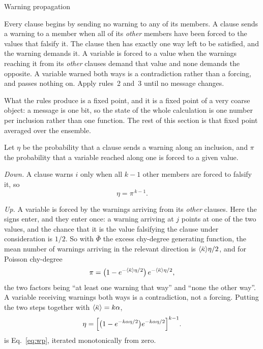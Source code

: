 \begin{model}{Warning propagation}
\begin{rules}
 Every clause begins by sending no warning to any of its
members.
 A clause sends a warning to a member when all of its
\emph{other} members have been forced to the values that falsify it. The clause
then has exactly one way left to be satisfied, and the warning demands it.
 A variable is forced to a value when the warnings
reaching it from its \emph{other} clauses demand that value and none demands the
opposite. A variable warned both ways is a contradiction rather than a forcing,
and passes nothing on.
 Apply rules~2 and~3 until no message changes.
\end{rules}
\end{model}

What the rules produce is a fixed point, and it is a fixed point of a very
coarse object: a message is one bit, so the state of the whole calculation is
one number per inclusion rather than one function. The rest of this section is
that fixed point averaged over the ensemble.

Let $\eta$ be the probability that a clause sends a warning along an inclusion,
and $\pi$ the probability that a variable reached along one is forced to a given
value.

\emph{Down.} A clause warns $i$ only when all $k-1$ other members are forced to
falsify it, so
\[
  \eta=\pi^{\,k-1}.
\]

\emph{Up.} A variable is forced by the warnings arriving from its \emph{other}
clauses. Here the signs enter, and they enter once: a warning arriving at $j$
points at one of the two values, and the chance that it is the value falsifying
the clause under consideration is $1/2$. So with $\bar\Phi$ the excess
chy-degree generating function, the mean number of warnings arriving in the
relevant direction is $\langle \bar\kappa \rangle\eta/2$, and for Poisson chy-degree
\[
  \pi=\bigl(1-e^{-\langle \bar\kappa \rangle\eta/2}\bigr)\,e^{-\langle \bar\kappa \rangle\eta/2},
\]
the two factors being ``at least one warning that way'' and ``none the other
way''. A variable receiving warnings both ways is a contradiction, not a
forcing. Putting the two steps together with $\langle \bar\kappa \rangle=k\alpha$,
\begin{equation}
  \eta=\Bigl[\bigl(1-e^{-k\alpha\eta/2}\bigr)e^{-k\alpha\eta/2}\Bigr]^{k-1}.
  \label{eq:wp}
\end{equation}  is Eq.~\eqref{eq:wp}, iterated monotonically from zero.

